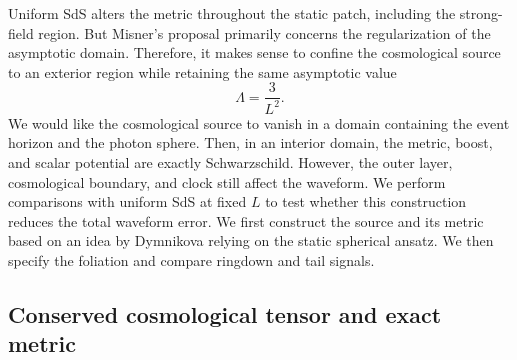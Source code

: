 \documentclass[
 aps,
 prd,
 reprint,
 superscriptaddress,
 nofootinbib,
 longbibliography
]{revtex4-2}
\begin{document}
Uniform SdS alters the metric throughout the static patch, including the
strong-field region. But Misner's proposal primarily concerns the regularization of the asymptotic domain. Therefore, it makes sense to confine the cosmological source to an exterior
region while retaining the same asymptotic value
\begin{equation}
 \Lambda=\frac{3}{L^2}.
 \label{eq:exterior_lambda}
\end{equation}
We would like the cosmological source to vanish in a domain containing the event horizon and the photon sphere. Then, in an interior domain, the metric, boost, and scalar potential are exactly Schwarzschild. However, the outer layer, cosmological boundary, and clock still affect the waveform.
We perform comparisons with uniform SdS at fixed $L$ to test whether this construction
reduces the total waveform error. We first construct the source and its metric based on an idea by Dymnikova \cite{Dymnikova:2000algebraic,Dymnikova:2002mass} relying on the static spherical ansatz. We then specify
the foliation and compare ringdown and tail signals.  

\subsection{Conserved cosmological tensor and exact metric}
\end{document}
